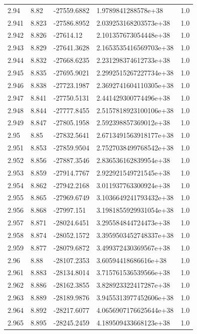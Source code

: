\begin{tabular}{lllll}
2.94 & 8.82 & -27559.6882 & 1.9789841288578e+38 & 1.0 \\
2.941 & 8.823 & -27586.8952 & 2.039253168203573e+38 & 1.0 \\
2.942 & 8.826 & -27614.12 & 2.101357673054448e+38 & 1.0 \\
2.943 & 8.829 & -27641.3628 & 2.1653535416569703e+38 & 1.0 \\
2.944 & 8.832 & -27668.6235 & 2.231298374612733e+38 & 1.0 \\
2.945 & 8.835 & -27695.9021 & 2.2992515267227734e+38 & 1.0 \\
2.946 & 8.838 & -27723.1987 & 2.3692741604110305e+38 & 1.0 \\
2.947 & 8.841 & -27750.5131 & 2.441429300774496e+38 & 1.0 \\
2.948 & 8.844 & -27777.8455 & 2.5157818923100106e+38 & 1.0 \\
2.949 & 8.847 & -27805.1958 & 2.592398857369012e+38 & 1.0 \\
2.95 & 8.85 & -27832.5641 & 2.6713491563918177e+38 & 1.0 \\
2.951 & 8.853 & -27859.9504 & 2.7527038499768542e+38 & 1.0 \\
2.952 & 8.856 & -27887.3546 & 2.836536162839954e+38 & 1.0 \\
2.953 & 8.859 & -27914.7767 & 2.922921549721545e+38 & 1.0 \\
2.954 & 8.862 & -27942.2168 & 3.011937763300924e+38 & 1.0 \\
2.955 & 8.865 & -27969.6749 & 3.1036649241793432e+38 & 1.0 \\
2.956 & 8.868 & -27997.151 & 3.1981855929931054e+38 & 1.0 \\
2.957 & 8.871 & -28024.6451 & 3.295584844724473e+38 & 1.0 \\
2.958 & 8.874 & -28052.1572 & 3.3959503452748337e+38 & 1.0 \\
2.959 & 8.877 & -28079.6872 & 3.499372430369567e+38 & 1.0 \\
2.96 & 8.88 & -28107.2353 & 3.60594418686616e+38 & 1.0 \\
2.961 & 8.883 & -28134.8014 & 3.715761536539566e+38 & 1.0 \\
2.962 & 8.886 & -28162.3855 & 3.828923322417287e+38 & 1.0 \\
2.963 & 8.889 & -28189.9876 & 3.9455313977452606e+38 & 1.0 \\
2.964 & 8.892 & -28217.6077 & 4.0656907176625644e+38 & 1.0 \\
2.965 & 8.895 & -28245.2459 & 4.189509433668123e+38 & 1.0 \\

\end{tabular}
